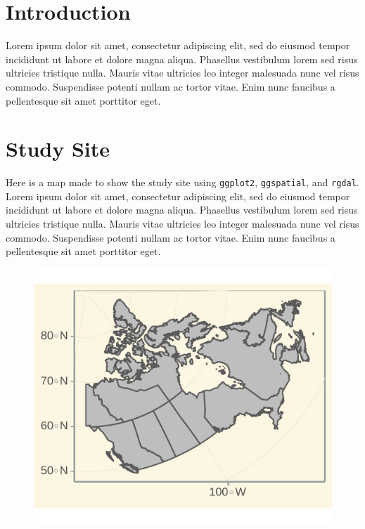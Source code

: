 \documentclass[article,30pt,extrafontsizes,showtrims]{memoir}
\begin{document}
\begin{multicols*}{3}
\small{\noindent
\section{Introduction}\label{introduction}

Lorem ipsum dolor sit amet, \autocite{holden_identifying_2012}
consectetur adipiscing elit, sed do eiusmod tempor incididunt ut labore
et dolore magna aliqua. Phasellus vestibulum lorem sed risus ultricies
tristique nulla. Mauris vitae ultricies leo integer malesuada nunc vel
risus commodo. Suspendisse potenti nullam ac tortor vitae. Enim nunc
faucibus a pellentesque sit amet porttitor eget.

\section{Study Site}\label{study-site}

Here is a map made to show the study site using \texttt{ggplot2},
\texttt{ggspatial}, and \texttt{rgdal}. Lorem ipsum dolor sit amet,
\autocite{middleton_geological_nodate} consectetur adipiscing elit, sed
do eiusmod tempor incididunt ut labore et dolore magna aliqua. Phasellus
vestibulum lorem sed risus ultricies tristique nulla. Mauris vitae
ultricies leo integer malesuada nunc vel risus commodo. Suspendisse
potenti nullam ac tortor vitae. Enim nunc faucibus a pellentesque sit
amet porttitor eget.

\begin{figure}

{\centering \includegraphics[width=0.8\linewidth]{skeleton_files/figure-latex/unnamed-chunk-2-1} 

}
\end{figure}}
\end{multicols*}
\end{document}
